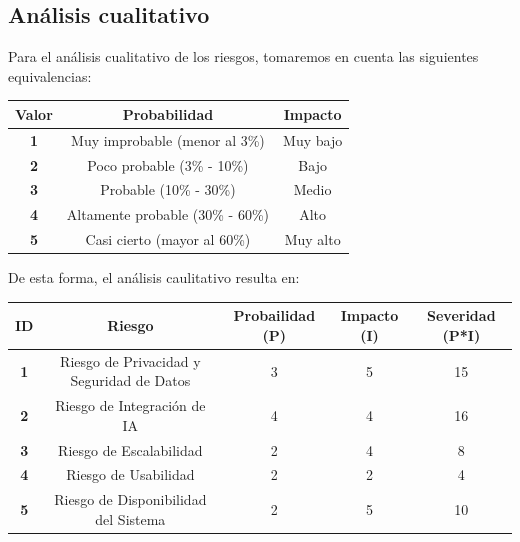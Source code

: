 \documentclass[a4paper,12pt]{article}
\begin{document}
    \subsection{Análisis cualitativo}
    \par Para el análisis cualitativo de los riesgos, tomaremos en cuenta las siguientes equivalencias:
    \begin{center}
        \begin{adjustbox}{width=1\textwidth}
            \begin{tabular}{ |c|c|c| }
                \hline
                \rowcolor{lightgray} \textbf{Valor} & \textbf{Probabilidad} & \textbf{Impacto} \\
                \hline    
                \textbf{1} & Muy improbable (menor al 3\%) & Muy bajo \\
                \hline
                \textbf{2} & Poco probable (3\% - 10\%) & Bajo \\
                \hline
                \textbf{3} & Probable (10\% - 30\%) & Medio \\
                \hline
                \textbf{4} & Altamente probable (30\% - 60\%) & Alto \\
                \hline
                \textbf{5} & Casi cierto (mayor al 60\%) & Muy alto \\
                \hline
            \end{tabular}
        \end{adjustbox}
    \end{center}
    \par De esta forma, el análisis caulitativo resulta en:
    \begin{center}
        \begin{adjustbox}{width=1\textwidth}
            \begin{tabular}{ |c|c|c|c|c| }
                \hline
                \rowcolor{lightgray} \textbf{ID} & \textbf{Riesgo} & \textbf{Probailidad (P)} & \textbf{Impacto (I)} & \textbf{Severidad (P*I)} \\
                \hline    
                \textbf{1} & Riesgo de Privacidad y Seguridad de Datos & 3 & 5 & 15 \\
                \hline
                \textbf{2} & Riesgo de Integración de IA & 4 & 4 & 16 \\
                \hline
                \textbf{3} & Riesgo de Escalabilidad & 2 & 4 & 8 \\
                \hline
                \textbf{4} & Riesgo de Usabilidad & 2 & 2 & 4 \\
                \hline
                \textbf{5} & Riesgo de Disponibilidad del Sistema & 2 & 5 & 10 \\
                \hline
            \end{tabular}
        \end{adjustbox}
    \end{center}
\end{document}
